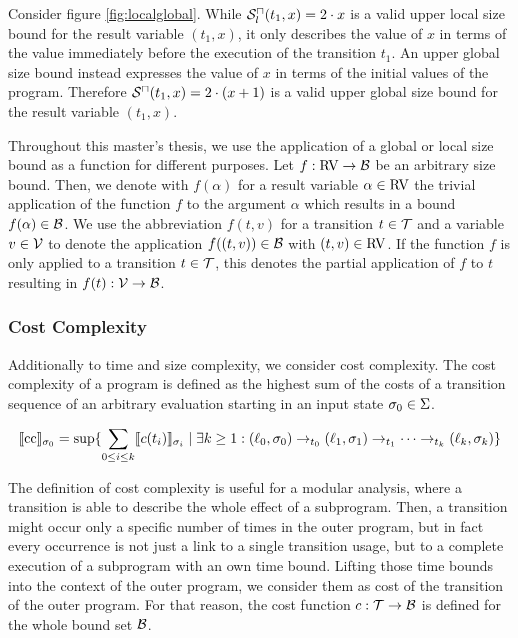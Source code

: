 

Consider figure \ref{fig:localglobal}.
While ${\mathcal{S}^\sqcap_l}(t_1, x) = 2 \cdot x$ is a valid upper local size bound for the result variable $(t_1, x)$, it only describes the value of $x$ in terms of the value immediately before the execution of the transition $t_1$.
An upper global size bound instead expresses the value of $x$ in terms of the initial values of the program.
Therefore ${\mathcal{S}^\sqcap}(t_1, x) = 2 \cdot (x + 1)$ is a valid upper global size bound for the result variable $(t_1, x)$.

Throughout this master's thesis, we use the application of a global or local size bound as a function for different purposes.
Let $f: \text{RV} \rightarrow \mathcal{B}$ be an arbitrary size bound.
Then, we denote with $f(\alpha)$ for a result variable $\alpha \in \text{RV}$ the trivial application of the function $f$ to the argument $\alpha$ which results in a bound $f(\alpha) \in \mathcal{B}$.
We use the abbreviation $f(t, v)$ for a transition $t \in \mathcal{T}$ and a variable $v \in \mathcal{V}$ to denote the application $f((t,v)) \in \mathcal{B}$ with $(t,v) \in \text{RV}$.
If the function $f$ is only applied to a transition $t \in \mathcal{T}$, this denotes the partial application of $f$ to $t$ resulting in $f(t): \mathcal{V} \rightarrow \mathcal{B}$.

\subsubsection{Cost Complexity}

Additionally to time and size complexity, we consider cost complexity.
The cost complexity of a program is defined as the highest sum of the costs of a transition sequence of an arbitrary evaluation starting in an input state $\sigma_0 \in \Sigma$.

\begin{definition}
\[ \llbracket \text{cc} \rrbracket_{\sigma_0} = \sup \lbrace  \sum_{0 \leq i \leq k} \llbracket c(t_i) \rrbracket_{\sigma_i} \mid \exists k \geq 1: 
  (\ell_0, \sigma_0) \rightarrow_{t_0} (\ell_1, \sigma_1) \rightarrow_{t_1} \dots \rightarrow_{t_k} (\ell_k, \sigma_k)  \rbrace \]
\end{definition}

The definition of cost complexity is useful for a modular analysis, where a transition is able to describe the whole effect of a subprogram.
Then, a transition might occur only a specific number of times in the outer program, but in fact every occurrence is not just a link to a single transition usage, but to a complete execution of a subprogram with an own time bound.
Lifting those time bounds into the context of the outer program, we consider them as cost of the transition of the outer program. 
For that reason, the cost function $c: \mathcal{T} \rightarrow \mathcal{B}$ is defined for the whole bound set $\mathcal{B}$.

